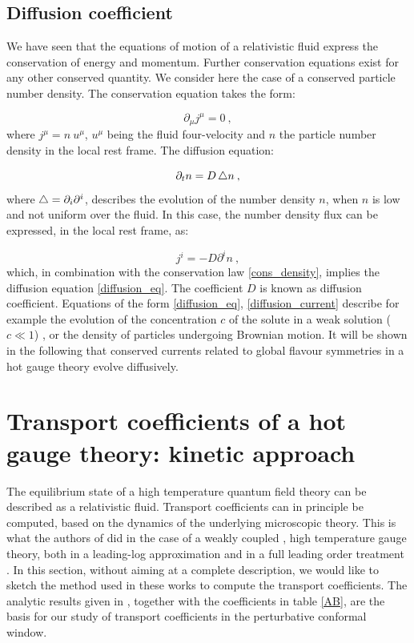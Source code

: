  \subsection{Diffusion coefficient}
 
We have seen that the equations of motion of a relativistic fluid express the conservation of energy and momentum. Further conservation equations exist for any other conserved quantity. We consider here the case of a conserved particle number density. The conservation equation takes the form:
 
 \begin{equation}
 \partial_{\mu} j^{\mu} = 0 \: ,
 \label{cons_density}
 \end{equation}
 where $j^{\mu} = n \: u^{\mu}$, $u^{\mu}$ being the fluid four-velocity and $n$ the particle number density in the local rest frame.
 The diffusion equation:
 
 \begin{equation}
 \partial_t n = D \mathop{}\!\mathbin\bigtriangleup n \: ,
 \label{diffusion_eq}
 \end{equation}
 where $\mathop{}\!\mathbin\bigtriangleup = \partial_i \partial^i$, describes the evolution of the number density $n$, when $n$ is low and not uniform over the fluid. In this case, the number density flux can be expressed, in the local rest frame, as:
 
\begin{equation}
j^i = - D \partial^i n \: ,
\label{diffusion_current}
\end{equation}
%
which, in combination with the conservation law \ref{cons_density}, implies the diffusion equation \ref{diffusion_eq}. The coefficient $D$ is known as diffusion coefficient. Equations of the form \ref{diffusion_eq}, \ref{diffusion_current} describe for example the evolution of the concentration $c$ of the solute in a weak solution ($c \ll 1$) \cite{landau2013fluid}, or the density of particles undergoing Brownian motion. It will be shown in the following that conserved currents related to global flavour symmetries in a hot gauge theory evolve diffusively.



\section{Transport coefficients of a hot gauge theory: kinetic approach}

The equilibrium state of a high temperature quantum field theory can be described as a relativistic fluid. Transport coefficients can in principle be computed, based on the dynamics of the underlying microscopic theory.
This is what the authors of \cite{Arnold:2000dr,Arnold:2003zc} did in the case of a weakly coupled , high temperature gauge theory, both in a leading-log approximation \cite{Arnold:2000dr} and in a full leading order treatment \cite{Arnold:2003zc}.
In this section, without aiming at a complete description, we would like to sketch the method used in these works to compute the transport coefficients. The analytic results given in \cite{Arnold:2000dr}, together with the coefficients in table \ref{AB}, are the basis for our study of transport coefficients in the perturbative conformal window.

